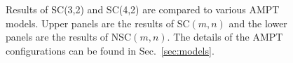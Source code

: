 \begin{figure}[!]
\begin{center}
        \caption{Results of  SC(3,2) and SC(4,2) are compared to various AMPT models. Upper panels are the results of SC$(m,n)$ and the lower panels are the results of NSC$(m,n)$. The details of the AMPT configurations can be found in Sec.~\ref{sec:models}.}
        \label{fig:Figure_4}
        \end{center}   
 \end{figure}
 
